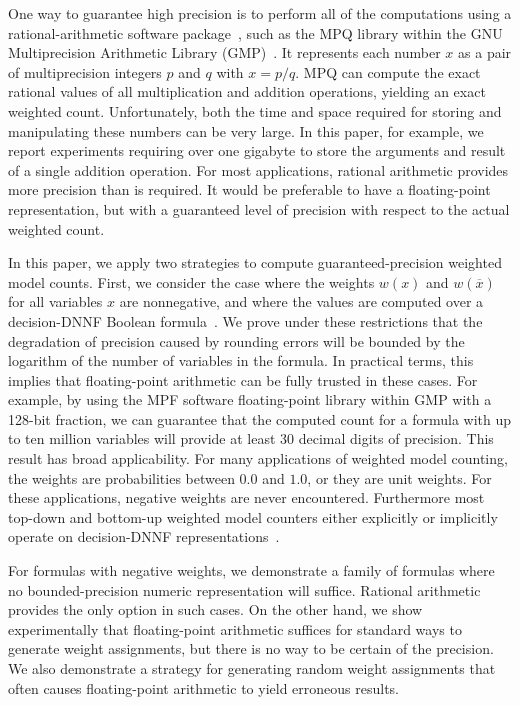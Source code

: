 \documentclass[letterpaper,USenglish,cleveref, autoref, thm-restate]{lipics-v2021}
\newcommand{\obar}[1]{\overline{#1}}
\begin{document}
One way to guarantee high precision is to perform all of the
computations using a rational-arithmetic software package~\cite{knuth:rational:1981}, such as the
MPQ library within the GNU Multiprecision Arithmetic
Library (GMP)~\cite{granlund:gmp:2015}.  It represents each number $x$ as a
pair of multiprecision integers $p$ and $q$ with $x = p/q$.
MPQ
can compute the exact rational values of all multiplication and
addition operations, yielding an exact weighted count.  Unfortunately,
both the time and space required for storing and manipulating these numbers can be very
large.  In this paper, for example, we report experiments requiring over one gigabyte
to store the arguments and result of a single addition operation.
For most applications, rational arithmetic provides more precision than is required.
It would be preferable to have a floating-point
representation, but with a guaranteed level of
precision with respect to the actual weighted count.

In this paper, we apply two strategies to compute 
guaranteed-precision weighted model counts.  First, we consider the
case where the weights $w(x)$ and $w(\obar{x})$ for all variables $x$ are nonnegative, and
where the values are computed over a decision-DNNF Boolean
formula~\cite{beame:uai:2013,huang:jair:2007,oztok:cp:2014}.
We prove under these restrictions
that the degradation of
precision caused by rounding errors will be bounded by the logarithm
of the number of variables in the formula.  In practical terms, this
implies that floating-point arithmetic can be fully trusted in these
cases.  For example, by using the MPF software floating-point library
within GMP with a 128-bit fraction, we can guarantee that the computed
count for a formula with up to ten million variables will provide at least
30 decimal digits of precision.
This result has broad applicability.
For many applications
of weighted model counting, the weights are probabilities between
$0.0$ and $1.0$, or they are unit weights.  For these applications,  negative weights are never encountered.
Furthermore most top-down and bottom-up weighted model
counters either explicitly or implicitly operate on decision-DNNF
representations~\cite{beame:uai:2013}.

For formulas with negative weights, we demonstrate a family of
formulas where no bounded-precision numeric representation will
suffice.  Rational arithmetic provides the only option in such cases.
On the other hand, we show experimentally that floating-point
arithmetic suffices for standard ways to generate weight assignments,
but there is no way to be certain of the precision.  We also
demonstrate a strategy for generating random weight assignments that
often causes floating-point arithmetic to yield erroneous results.
\end{document}
